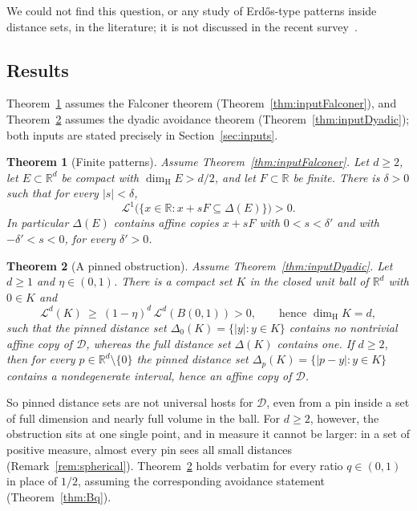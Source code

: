\documentclass[11pt]{amsart}
\newtheorem{maintheorem}{Theorem}
\theoremstyle{definition}
\theoremstyle{remark}
\newcommand{\R}{\mathbb{R}}
\newcommand{\dimH}{\dim_{\mathrm H}}
\newcommand{\Lm}{\mathcal{L}}
\newcommand{\Dy}{\mathcal{D}}
\begin{document}
We could not find this question, or any study of Erd\H{o}s-type patterns inside distance sets,
in the literature; it is not discussed in the recent survey~\cite{JungLaiMooroogen2024}.

\subsection{Results}
Theorem~\ref{thm:A} assumes the Falconer theorem (Theorem~\ref{thm:inputFalconer}), and
Theorem~\ref{thm:B} assumes the dyadic avoidance theorem (Theorem~\ref{thm:inputDyadic}); both
inputs are stated precisely in Section~\ref{sec:inputs}.

\begin{maintheorem}[Finite patterns]\label{thm:A}
Assume Theorem~\ref{thm:inputFalconer}. Let $d\ge2$, let $E\subset\R^d$ be compact with $\dimH E>d/2$, and let
$F\subset\R$ be finite. There is $\delta>0$ such that for every $|s|<\delta$,
\[
  \Lm^1\bigl(\{x\in\R : x+sF\subseteq\Delta(E)\}\bigr)>0 .
\]
In particular $\Delta(E)$ contains affine copies $x+sF$ with $0<s<\delta'$ and with
$-\delta'<s<0$, for every $\delta'>0$.
\end{maintheorem}

\begin{maintheorem}[A pinned obstruction]\label{thm:B}
Assume Theorem~\ref{thm:inputDyadic}. Let $d\ge1$ and $\eta\in(0,1)$. There is a compact set $K$ in the closed
unit ball of $\R^d$ with $0\in K$ and
\[
  \Lm^d(K)\ \ge\ (1-\eta)^d\,\Lm^d(B(0,1))>0,\qquad\text{hence }\dimH K=d,
\]
such that the pinned distance set $\Delta_0(K)=\{|y|:y\in K\}$ contains no nontrivial affine
copy of $\Dy$, whereas the full distance set $\Delta(K)$ contains one.
If $d\ge2$, then for every $p\in\R^d\setminus\{0\}$ the pinned distance set
$\Delta_p(K)=\{|p-y|:y\in K\}$ contains a nondegenerate interval, hence an affine copy of $\Dy$.
\end{maintheorem}

So pinned distance sets are not universal hosts for $\Dy$, even from a pin inside a set of
full dimension and nearly full volume in the ball. For $d\ge2$, however, the obstruction sits at
one single point, and in measure it cannot be larger: in a set of positive measure, almost every
pin sees all small distances (Remark~\ref{rem:spherical}). Theorem~\ref{thm:B} holds verbatim for every ratio $q\in(0,1)$ in place of $1/2$, assuming
the corresponding avoidance statement (Theorem~\ref{thm:Bq}).
\end{document}
